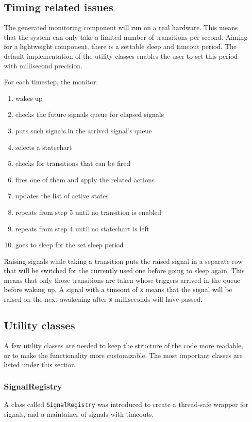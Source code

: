   \subsection{Timing related issues}
The generated monitoring component will run on a real hardware. This means that the system can only take a limited number of transitions per second. Aiming for a lightweight component, there is a settable sleep and timeout period. The default implementation of the utility classes enables the user to set this period with millisecond precision.

For each timestep, the monitor:
\begin{enumerate}
  \item wakes up
  \item checks the future signals queue for elapsed signals
  \item puts such signals in the arrived signal's queue
  \item selects a statechart
  \item checks for transitions that can be fired
  \item fires one of them and apply the related actions
  \item updates the list of active states
  \item repeats from step 5 until no transition is enabled
  \item repeats from step 4 until no statechart is left
  \item goes to sleep for the set sleep period
\end{enumerate}
Raising signals while taking a transition puts the raised signal in a separate row that will be switched for the currently used one before going to sleep again. This means that only those transitions are taken whose triggers arrived in the queue before waking up. A signal with a timeout of \verb!x! means that the signal will be raised on the next awakening after \verb!x! milliseconds will have passed.
  \subsection{Utility classes}
A few utility classes are needed to keep the structure of the code more readable, or to make the functionality more customizable. The most important classes are listed under this section.
    \subsubsection{SignalRegistry}
A class called \verb!SignalRegistry! was introduced to create a thread-safe wrapper for signals, and a maintainer of signals with timeouts.

